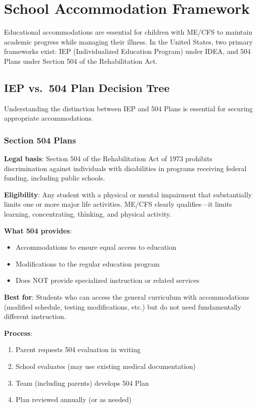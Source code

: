 \section{School Accommodation Framework}
\label{sec:ped-school-accommodations}

Educational accommodations are essential for children with ME/CFS to maintain academic progress while managing their illness. In the United States, two primary frameworks exist: IEP (Individualized Education Program) under IDEA, and 504 Plans under Section 504 of the Rehabilitation Act.

\subsection{IEP vs.\ 504 Plan Decision Tree}
\label{subsec:iep-vs-504}

Understanding the distinction between IEP and 504 Plans is essential for securing appropriate accommodations.

\subsubsection{Section 504 Plans}

\textbf{Legal basis}: Section 504 of the Rehabilitation Act of 1973 prohibits discrimination against individuals with disabilities in programs receiving federal funding, including public schools.

\textbf{Eligibility}: Any student with a physical or mental impairment that substantially limits one or more major life activities. ME/CFS clearly qualifies---it limits learning, concentrating, thinking, and physical activity.

\textbf{What 504 provides}:
\begin{itemize}
    \item Accommodations to ensure equal access to education
    \item Modifications to the regular education program
    \item Does NOT provide specialized instruction or related services
\end{itemize}

\textbf{Best for}: Students who can access the general curriculum with accommodations (modified schedule, testing modifications, etc.) but do not need fundamentally different instruction.

\textbf{Process}:
\begin{enumerate}
    \item Parent requests 504 evaluation in writing
    \item School evaluates (may use existing medical documentation)
    \item Team (including parents) develops 504 Plan
    \item Plan reviewed annually (or as needed)
\end{enumerate}

